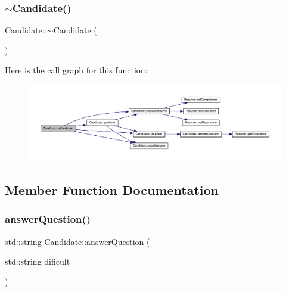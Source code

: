 \subsubsection{\texorpdfstring{$\sim$\+Candidate()}{~Candidate()}}
{\footnotesize\ttfamily Candidate\+::$\sim$\+Candidate (\begin{DoxyParamCaption}{ }\end{DoxyParamCaption})\hspace{0.3cm}{\ttfamily [inline]}}

Here is the call graph for this function\+:
\nopagebreak
\begin{figure}[H]
\begin{center}
\leavevmode
\includegraphics[width=350pt]{class_candidate_a61ad4ae35e7a3ce5e5b91204b55c0b55_cgraph}
\end{center}
\end{figure}


\subsection{Member Function Documentation}
\hypertarget{class_candidate_aa0d4d9afae45b7ce3a3808af2bfba228}{}\label{class_candidate_aa0d4d9afae45b7ce3a3808af2bfba228} 
\subsubsection{\texorpdfstring{answer\+Question()}{answerQuestion()}}
{\footnotesize\ttfamily std\+::string Candidate\+::answer\+Question (\begin{DoxyParamCaption}\item[{std\+::string}]{dificult }\end{DoxyParamCaption})\hspace{0.3cm}{\ttfamily [private]}}

